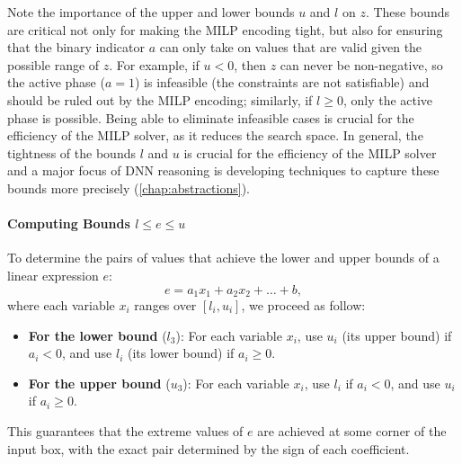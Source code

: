 \documentclass[oneside,11pt,dvipsnames]{book}
\numberwithin{equation}{section}
\theoremstyle{definition}
\theoremstyle{remark}
\begin{document}
Note the importance of the upper and lower bounds $u$ and $l$ on $z$. These bounds are critical not only for making the MILP encoding tight, but also for ensuring that the binary indicator $a$ can only take on values that are valid given the possible range of $z$. For example, if $u < 0$, then $z$ can never be non-negative, so the active phase ($a=1$) is infeasible (the constraints are not satisfiable) and should be ruled out by the MILP encoding; similarly, if $l \geq 0$, only the active phase is possible. Being able to eliminate infeasible cases is crucial for the efficiency of the MILP solver, as it reduces the search space. In general, the tightness of the bounds $l$ and $u$ is crucial for the efficiency of the MILP solver and a major focus of DNN reasoning is developing techniques to capture these bounds more precisely (\autoref{chap:abstractions}).

\paragraph{Computing Bounds $l \le e \le u$}  To determine the pairs of values that achieve the lower and upper bounds of a linear expression $e$:
\[
 e = a_1 x_1 + a_2 x_2 + \ldots + b,
\]
where each variable $x_i$ ranges over $[l_i, u_i]$, we proceed as follow:

\begin{itemize}
    \item \textbf{For the lower bound} ($l_3$):
    For each variable $x_i$, use $u_i$ (its upper bound) if $a_i < 0$, and use $l_i$ (its lower bound) if $a_i \geq 0$.
    \item \textbf{For the upper bound} ($u_3$):
    For each variable $x_i$, use $l_i$ if $a_i < 0$, and use $u_i$ if $a_i \geq 0$.
\end{itemize}

This guarantees that the extreme values of $e$ are achieved at some corner of the input box, with the exact pair determined by the sign of each coefficient.
\end{document}
